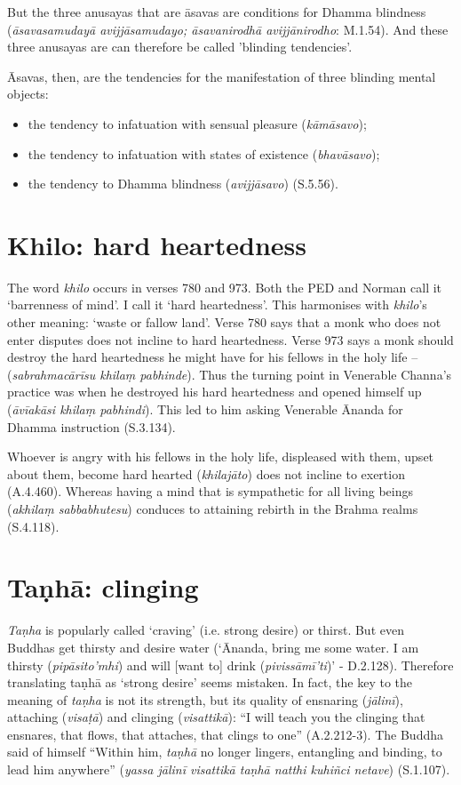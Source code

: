 But the three anusayas that are āsavas are conditions for Dhamma blindness (\textit{āsavasamudayā avijjāsamudayo; āsavanirodhā avijjānirodho}: M.1.54). And these three anusayas are can therefore be called 'blinding tendencies'.

Āsavas, then, are the tendencies for the manifestation of three blinding mental objects:

\begin{itemize}
\item the tendency to infatuation with sensual pleasure (\textit{kāmāsavo});
\item the tendency to infatuation with states of existence (\textit{bhavāsavo});
\item the tendency to Dhamma blindness (\textit{avijjāsavo}) (S.5.56).
\end{itemize}

\section*{Khilo: hard heartedness}\label{transl-hard-heartedness}

The word \textit{khilo} occurs in verses 780 and 973. Both the PED and Norman call it `barrenness of mind'. I call it `hard heartedness'. This harmonises with \textit{khilo}'s other meaning: `waste or fallow land'. Verse 780 says that a monk who does not enter disputes does not incline to hard heartedness. Verse 973 says a monk should destroy the hard heartedness he might have for his fellows in the holy life -- (\textit{sabrahmacārīsu khilaṃ pabhinde}). Thus the turning point in Venerable Channa's practice was when he destroyed his hard heartedness and opened himself up (\textit{āvīakāsi khilaṃ pabhindi}). This led to him asking Venerable Ānanda for Dhamma instruction (S.3.134).

Whoever is angry with his fellows in the holy life, displeased with them, upset about them, become hard hearted (\textit{khilajāto}) does not incline to exertion (A.4.460). Whereas having a mind that is sympathetic for all living beings (\textit{akhilaṃ sabbabhutesu}) conduces to attaining rebirth in the Brahma realms (S.4.118).

\section*{Ta\d{n}h\=a: clinging}\label{transl-clinging}

\textit{Taṇha} is popularly called `craving' (i.e. strong desire) or thirst. But even Buddhas get thirsty and desire water (`Ānanda, bring me some water. I am thirsty (\textit{pipāsito'mhi}) and will [want to] drink (\textit{pivissāmī'ti})' - D.2.128). Therefore translating taṇhā as `strong desire' seems mistaken. In fact, the key to the meaning of \textit{taṇha} is not its strength, but its quality of ensnaring (\textit{jālinī}), attaching (\textit{visaṭā}) and clinging (\textit{visattikā}): ``I will teach you the clinging that ensnares, that flows, that attaches, that clings to one'' (A.2.212-3). The Buddha said of himself ``Within him, \textit{taṇhā} no longer lingers, entangling and binding, to lead him anywhere'' (\textit{yassa jālinī visattikā taṇhā natthi kuhiñci netave}) (S.1.107).

